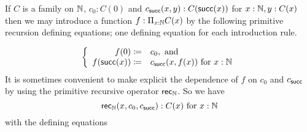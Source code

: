 If $C$ is a family on $\mathbb{N}$, $c_0:C(0)$ and $c_{\mathsf{succ}}(x,y):C(\mathsf{succ}(x))$ for $x:\mathbb{N},y:C(x)$ then we may introduce a function $f:\Pi_{x:\mathbb{N}}C(x)$ by the following primitive recursion defining equations; one defining equation for each introduction rule.

  \[\left\{\begin{array}{rl}
f(0)\coloneqq& c_0, \mbox{ and}\\
f(\mathsf{succ}(x))\coloneqq& c_{\mathsf{succ}}(x,f(x))\mbox{ for } x:\mathbb{N}
  \end{array}\right.\]
It is sometimes convenient to make explicit the dependence of $f$ on $c_0$ and $c_{\mathsf{succ}}$ by using the primitive recursive operator ${\sf rec}_\mathbb{N}$.  So we have
  \[ {\sf rec}_\mathbb{N}(x,c_0,c_{\mathsf{succ}}):C(x)\mbox{ for } x:\mathbb{N}\]
with the defining equations









